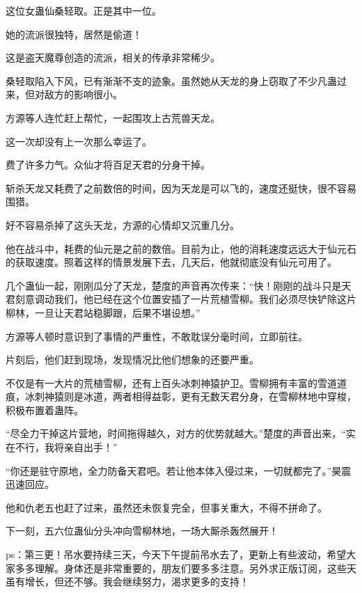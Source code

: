 \begin{this_body}
这位女蛊仙桑轻取。正是其中一位。

她的流派很独特，居然是偷道！

这是盗天魔尊创造的流派，相关的传承非常稀少。

桑轻取陷入下风，已有渐渐不支的迹象。虽然她从天龙的身上窃取了不少凡蛊过来，但对敌方的影响很小。

方源等人连忙赶上帮忙，一起围攻上古荒兽天龙。

这一次却没有上一次那么幸运了。

费了许多力气。众仙才将百足天君的分身干掉。

斩杀天龙又耗费了之前数倍的时间，因为天龙是可以飞的，速度还挺快，很不容易围猎。

好不容易杀掉了这头天龙，方源的心情却又沉重几分。

他在战斗中，耗费的仙元是之前的数倍。目前为止，他的消耗速度远远大于仙元石的获取速度。照着这样的情景发展下去，几天后，他就彻底没有仙元可用了。

几个蛊仙一起，刚刚瓜分了天龙，楚度的声音再次传来：“快！刚刚的战斗只是天君刻意调动我们，他已经在这个位置安插了一片荒植雪柳。我们必须尽快铲除这片柳林，一旦让天君站稳脚跟，后果不堪设想。”

方源等人顿时意识到了事情的严重性，不敢耽误分毫时间，立即前往。

片刻后，他们赶到现场，发现情况比他们想象的还要严重。

不仅是有一大片的荒植雪柳，还有上百头冰刺神猿护卫。雪柳拥有丰富的雪道道痕，冰刺神猿则是冰道，两者相得益彰，更有无数天君分身，在雪柳林地中穿梭，积极布置着蛊阵。

“尽全力干掉这片营地，时间拖得越久，对方的优势就越大。”楚度的声音出来，“实在不行，我将亲自出手！”

“你还是驻守原地，全力防备天君吧。若让他本体入侵过来，一切就都完了。”昊震迅速回应。

他和仇老五也赶了过来，虽然还未恢复完全，但事关重大，不得不拼命了。

下一刻，五六位蛊仙分头冲向雪柳林地，一场大厮杀轰然展开！

ps：第三更！吊水要持续三天，今天下午提前吊水去了，更新上有些波动，希望大家多多理解。身体还是非常重要的，朋友们要多多注意。另外求正版订阅，这些天虽有增长，但还不够。我会继续努力，渴求更多的支持！

\end{this_body}

